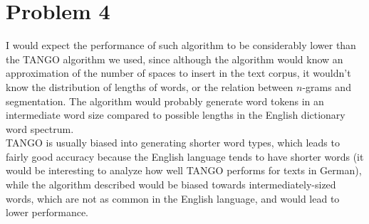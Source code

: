 \documentclass[112pt]{article}
\begin{document}
\section*{Problem 4}
I would expect the performance of such algorithm to be considerably lower than the TANGO algorithm we used, since although the algorithm would know an approximation of the number of spaces to insert in the text corpus, it wouldn't know the distribution of lengths of words, or the relation between $n$-grams and segmentation.  The algorithm would probably generate word tokens in an intermediate word size compared to possible lengths in the English dictionary word spectrum. \\

TANGO is usually biased into generating shorter word types, which leads to fairly good accuracy because the English language tends to have shorter words (it would be interesting to analyze how well TANGO performs for texts in German), while the algorithm described would be biased towards intermediately-sized words, which are not as common in the English language, and would lead to lower performance.
\end{document}
